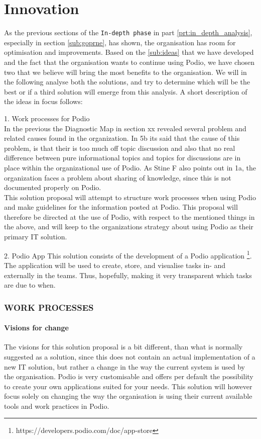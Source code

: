 \part{Innovation}
As the previous sections of the \texttt{In-depth phase} in part \ref{prt:in_depth_analysis},
especially in section \ref{sub:goprne}, has shown,
the organisation has room for optimisation and improvements. Based on the \ref{sub:ideas} that we
have developed and the fact that the organisation wants to continue using Podio, we have chosen two that we believe will bring the most benefits to the organisation.
We will in the following analyse both the solutions, and try to determine which will be the best or
if a third solution will emerge from this analysis. A short description of the ideas in focus
follows:


1. Work processes for Podio\\
In the previous the Diagnostic Map in section xx revealed several problem and related causes found in the organization. In 5b its said that the cause of this problem, is that their is too much off topic discussion and also that no real difference between pure informational topics and topics for discussions are in place within the organizational use of Podio. As Stine F also points out in 1a, the organization faces a problem about sharing of knowledge, since this is not documented properly on Podio.\\

This solution proposal will attempt to structure work processes when using Podio and make guidelines for the information posted at Podio. This proposal will therefore be directed at the use of Podio, with respect to the mentioned things in the above, and will keep to the organizations strategy about using Podio as their primary IT solution. 

2. Podio App
This solution consists of the development of a Podio application \footnote{https://developers.podio.com/doc/app-store}.
The application will be used to create, store, and visualise tasks in- and externally in the teams.
Thus, hopefully, making it very transparent which tasks are due to when.\\

\section{WORK PROCESSES}
\subsection{Visions for change}
The visions for this solution proposal is a bit different, than what is normally suggested as a
solution, since this does not contain an actual implementation of a new IT solution, but rather a
change in the way the current system is used by the organisation.
Podio is very customisable and offers per default the possibility to create your own applications
suited for your needs. This solution will however focus solely on changing the way the organisation
is using their current available tools and work practices in Podio.


